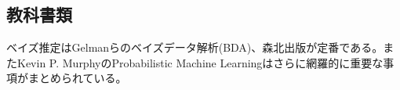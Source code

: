 \documentclass[xelatex,a4paper, twocolumn]{bxjsreport}
\begin{document}






%
%

\footnotesize
{}

\subsection*{教科書類}
ベイズ推定はGelmanらのベイズデータ解析(BDA)、森北出版が定番である。またKevin P. MurphyのProbabilistic Machine Learningはさらに網羅的に重要な事項がまとめられている。





\end{document}
